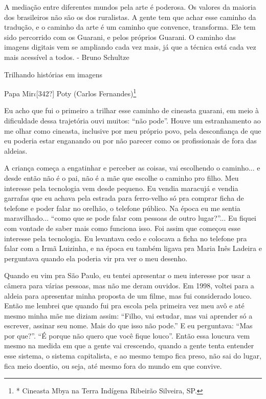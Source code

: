 \documentclass{article}
\begin{document}
A media\c{c}\~ao entre diferentes mundos pela arte \'e poderosa. Os
valores da maioria dos brasileiros n\~ao s\~ao os dos ruralistas. A
gente tem que achar esse caminho da tradu\c{c}\~ao, e o caminho da arte
\'e um caminho que convence, transforma. Ele tem sido percorrido com os
Guarani, e pelos pr\'oprios Guarani. O caminho das imagens digitais vem
se ampliando cada vez mais, j\'a que a t\'ecnica est\'a cada vez mais
acess\'ivel a todos. - Bruno Schultze 

Trilhando hist\'orias em imagens

Papa Mir$\iota $[342?] Poty (Carlos Fernandes)\footnote{* Cineasta Mbya
na Terra Ind\'igena Ribeir\~ao Silveira, SP.}

Eu acho que fui o primeiro a trilhar esse caminho de cineasta guarani,
em meio \`a dificuldade dessa trajet\'oria ouvi muitos:
{\textquotedblleft}n\~ao pode{\textquotedblright}. Houve um
estranhamento ao me olhar como cineasta, inclusive por meu pr\'oprio
povo, pela desconfian\c{c}a de que eu poderia estar enganando ou por
n\~ao parecer como os profissionais de fora das aldeias.

A crian\c{c}a come\c{c}a a engatinhar e perceber as coisas, vai
escolhendo o caminho... e desde ent\~ao n\~ao \'e o pai, n\~ao \'e a
m\~ae que escolhe o caminho pro filho. Meu interesse pela tecnologia
vem desde pequeno. Eu vendia maracuj\'a e vendia garrafas que eu achava
pela estrada para ferro-velho s\'o pra comprar ficha de telefone e
poder falar no orelh\~ao, o telefone p\'ublico. Na \'epoca eu me sentia
maravilhado... {\textquotedblleft}como que se pode falar com pessoas de
outro lugar?{\textquotedblright}... Eu fiquei com vontade de saber mais
como funciona isso. Foi assim que come\c{c}ou esse interesse pela
tecnologia. Eu levantava cedo e colocava a ficha no telefone pra falar
com a Irm\~a Luizinha, e na \'epoca eu tamb\'em ligava pra Maria In\^es
Ladeira e perguntava quando ela poderia vir pra ver o meu desenho. 

Quando eu vim pra S\~ao Paulo, eu tentei apresentar o meu interesse por
usar a c\^amera para v\'arias pessoas, mas n\~ao me deram ouvidos. Em
1998, voltei para a aldeia para apresentar minha proposta de um filme,
mas fui considerado louco. Ent\~ao me lembrei que quando fui pra escola
pela primeira vez meu av\^o e at\'e mesmo minha m\~ae me diziam assim:
{\textquotedblleft}Filho, vai estudar, mas vai aprender s\'o a
escrever, assinar seu nome. Mais do que isso n\~ao
pode.{\textquotedblright} E eu perguntava: {\textquotedblleft}Mas por
que?{\textquotedblright}. {\textquotedblleft}\'E porque n\~ao quero que
voc\^e fique louco{\textquotedblright}. Ent\~ao essa loucura vem mesmo
na medida em que a gente vai crescendo, quando a gente tenta entender
esse sistema, o sistema capitalista, e ao mesmo tempo fica preso, n\~ao
sai do lugar, fica meio doentio, ou seja, at\'e mesmo fora do mundo em
que convive. 
\end{document}
